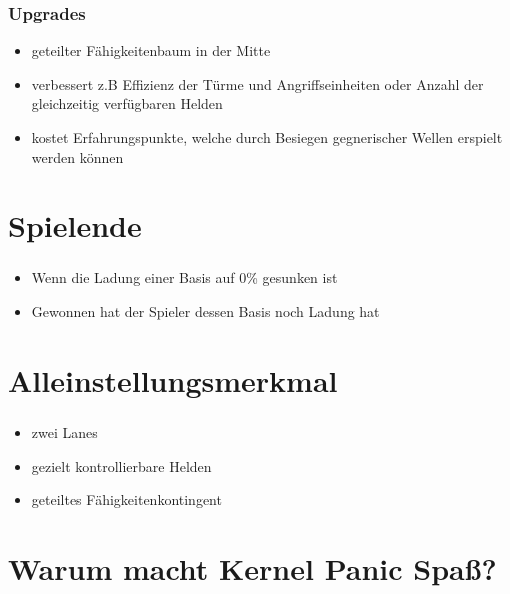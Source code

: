 \documentclass{beamer}
\begin{document}
\begin{frame}
\frametitle{Upgrades}
\begin{itemize}
\item geteilter Fähigkeitenbaum in der Mitte
\item verbessert z.B Effizienz der Türme und Angriffseinheiten oder Anzahl der gleichzeitig verfügbaren Helden
\item kostet Erfahrungspunkte, welche durch Besiegen gegnerischer Wellen erspielt werden können
\end{itemize}
\end{frame}

\section{Spielende}
\begin{frame}
\frametitle{\secname}
\begin{itemize}
\item Wenn die Ladung einer Basis auf 0\% gesunken ist
\item Gewonnen hat der Spieler dessen Basis noch Ladung hat
\end{itemize}
\end{frame}

\section{Alleinstellungsmerkmal}
\begin{frame}
\frametitle{\secname}
\begin{itemize}
\item zwei Lanes
\item gezielt kontrollierbare Helden
\item geteiltes Fähigkeitenkontingent
\end{itemize}
\end{frame}

\section{Warum macht Kernel Panic Spaß?}
\begin{frame}
\frametitle{\secname}
\end{frame}
\end{document}
